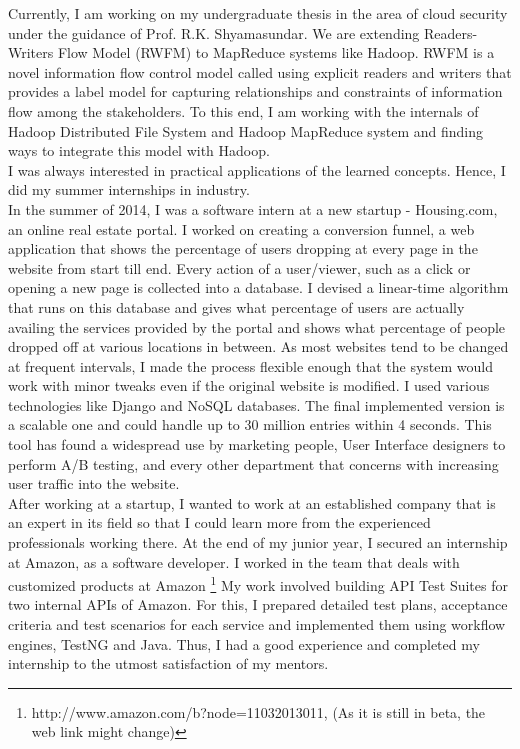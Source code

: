 \documentclass{article}
\begin{document}
Currently, I am working on my undergraduate thesis in the area of cloud security under the guidance of Prof. R.K. Shyamasundar. We are extending Readers-Writers Flow Model (RWFM) to MapReduce systems like Hadoop. RWFM is a novel information flow control model called using explicit readers and writers that provides a label model for capturing relationships and constraints of information flow among the stakeholders. To this end, I am working with the internals of Hadoop Distributed File System and Hadoop MapReduce system and finding ways to integrate this model with Hadoop.
\\

I was always interested in practical applications of the learned concepts. Hence, I did my summer internships in industry.
\\

In the summer of 2014, I was a software intern at a new startup - Housing.com, an online real estate portal. I worked on creating a conversion funnel, a web application that shows the percentage of users dropping at every page in the website from start till end. Every action of a user/viewer, such as a click or opening a new page is collected into a database. I devised a linear-time algorithm that runs on this database and gives what percentage of users are actually availing the services provided by the portal and shows what percentage of people dropped off at various locations in between. As most websites tend to be changed at frequent intervals, I made the process flexible enough that the system would work with minor tweaks even if the original website is modified. I used various technologies like Django and NoSQL databases. The final implemented version is a scalable one and could handle up to 30 million entries within 4 seconds. This tool has found a widespread use by marketing people, User Interface designers to perform A/B testing, and every other department that concerns with increasing user traffic into the website.
\\

After working at a startup, I wanted to work at an established company that is an expert in its field so that I could learn more from the experienced professionals working there. At the end of my junior year, I secured an internship at Amazon, as a software developer. I worked in the team that deals with customized products at Amazon \footnote{http://www.amazon.com/b?node=11032013011, (As it is still in beta, the web link might change)} My work involved building API Test Suites for two internal APIs of Amazon. For this, I prepared detailed test plans, acceptance criteria and test scenarios for each service and implemented them using workflow engines, TestNG and Java. Thus, I had a good experience and completed my internship to the utmost satisfaction of my mentors.
\\
\end{document}
